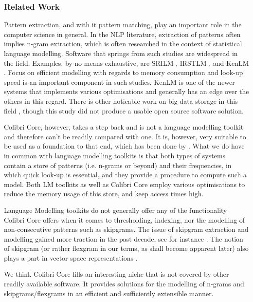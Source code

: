 \documentclass[a4paper,12pt]{article}
\begin{document}
\subsubsection{Related Work}

Pattern extraction, and with it pattern matching, play an important role in the
computer science in general. In the NLP literature, extraction of patterns
often implies n-gram extraction, which is often researched in the context of
statistical language modelling.  Software that springs from such studies are
widespread in the field. Examples, by no means exhaustive, are SRILM
\cite{SRILM}, IRSTLM \cite{IRSTLM}, and KenLM \cite{KENLM}. Focus on efficient
modelling with regards to memory consumption and look-up speed is an important
component in such studies. KenLM is one of the newer systems that implements
various optimisations and generally has an edge over the others in this regard. There is other
noticable work on big data storage in this field \cite{Guthrie2012}, though this study did not
produce a usable open source software solution. 

Colibri Core, however, takes a step back and is not a language modelling
toolkit and therefore can't be readily compared with one. It is, however, very
suitable to be used as a foundation to that end, which has been done by
\cite{COCOCPYP}. What we do have in common with language modelling toolkits is
that both types of systems contain a store of patterns (i.e. n-grams or beyond)
and their frequencies, in which quick look-up is essential, and they provide a
procedure to compute such a model. Both LM toolkits as well as Colibri Core
employ various optimisations to reduce the memory usage of this store, and keep
access times high. 

Language Modelling toolkits do not generally offer any of the functionality
Colibri Core offers when it comes to thresholding, indexing, nor the modelling of
non-consecutive patterns such as skipgrams. The issue of skipgram extraction
and modelling gained more traction in the past decade, see for instance
\cite{Guthrie06}. The notion of skipgram (or rather flexgram in our terms, as
shall become apparent later) also plays a part in vector space representations
\cite{Mikolov08}.

We think Colibri Core fills an interesting niche that is not covered by other
readily available software. It provides solutions for the modelling of n-grams and 
skipgrams/flexgrams in an efficient and sufficiently extensible manner.
\end{document}
